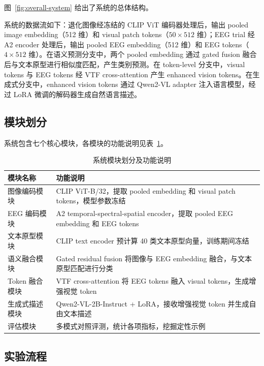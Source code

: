 图~\ref{fig:overall-system} 给出了系统的总体结构。


系统的数据流如下：退化图像经冻结的 CLIP ViT 编码器处理后，输出 pooled image embedding（512 维）和 visual patch tokens（$50\times512$ 维）；EEG trial 经 A2 encoder 处理后，输出 pooled EEG embedding（512 维）和 EEG tokens（$4\times512$ 维）。在语义预测分支中，两个 pooled embedding 通过 gated fusion 融合后与文本原型进行相似度匹配，产生类别预测。在 token-level 分支中，visual tokens 与 EEG tokens 经 VTF cross-attention 产生 enhanced vision tokens。在生成式分支中，enhanced vision tokens 通过 Qwen2-VL adapter 注入语言模型，经过 LoRA 微调的解码器生成自然语言描述。

\subsection{模块划分}

系统包含七个核心模块，各模块的功能说明见表~\ref{tab:modules}。

\begin{table}[htbp]
  \centering
  \caption{系统模块划分及功能说明}
  \label{tab:modules}
  \begin{tabularx}{\linewidth}{l X}
    \toprule
    模块名称 & 功能说明 \\
    \midrule
    图像编码模块 & CLIP ViT-B/32，提取 pooled embedding 和 visual patch tokens，模型参数冻结 \\
    EEG 编码模块 & A2 temporal-spectral-spatial encoder，提取 pooled EEG embedding 和 EEG tokens \\
    文本原型模块 & CLIP text encoder 预计算 40 类文本原型向量，训练期间冻结 \\
    语义融合模块 & Gated residual fusion 将图像与 EEG embedding 融合，与文本原型匹配进行分类 \\
    Token 融合模块 & VTF cross-attention 将 EEG tokens 融入 visual tokens，生成增强视觉 token \\
    生成式描述模块 & Qwen2-VL-2B-Instruct + LoRA，接收增强视觉 token 并生成自由文本描述 \\
    评估模块 & 多模式对照评测，统计各项指标，挖掘定性示例 \\
    \bottomrule
  \end{tabularx}
\end{table}

\subsection{实验流程}

